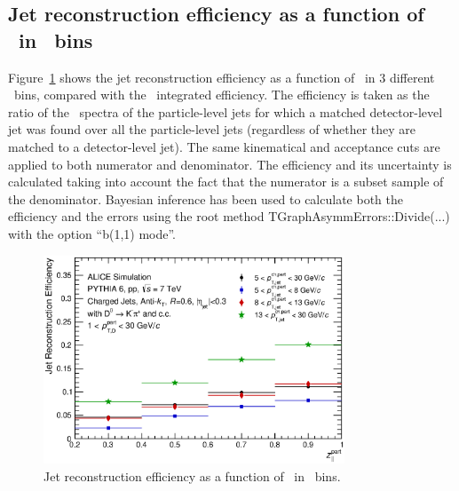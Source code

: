 \subsection{Jet reconstruction efficiency as a function of \zpargen\ in \ptchjetgen\ bins}
Figure~\ref{fig:D0_Full_R060_Efficiency_Z_Vs_JetPt} shows the jet reconstruction efficiency as a function of \zpargen\ in 3 different \ptchjetgen\ bins,
compared with the \ptchjetgen\ integrated efficiency. The efficiency is taken as the ratio of the \zpar\ spectra of the particle-level jets for which a matched
detector-level jet was found over
all the particle-level jets (regardless of whether they are matched to a detector-level jet).
The same kinematical and acceptance cuts are applied to both numerator and denominator. The efficiency and its uncertainty is calculated
taking into account the fact that the numerator is a subset sample of the denominator. Bayesian inference has been used to calculate both
the efficiency and the errors using the root method TGraphAsymmErrors::Divide(...) with the option ``b(1,1) mode''.
\begin{figure}[tbh]
\begin{center}
\includegraphics[width=0.8\textwidth]{img/D0_Full_R060_Efficiency_Z_Vs_JetPt}
 \caption{Jet reconstruction efficiency as a function of \zpargen\ in \ptchjetgen\ bins.} 
 \label{fig:D0_Full_R060_Efficiency_Z_Vs_JetPt}
\end{center}
\end{figure}
